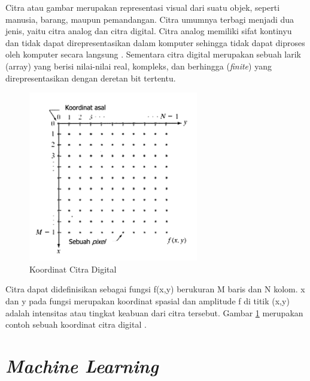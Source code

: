 Citra atau gambar merupakan representasi visual dari suatu objek, seperti manusia, barang, maupun pemandangan. Citra 
umumnya terbagi menjadi dua jenis, yaitu citra analog dan citra digital. Citra analog memiliki sifat kontinyu dan tidak 
dapat direpresentasikan dalam komputer sehingga tidak dapat diproses oleh komputer secara langsung \parencite{Tyagi2018}. 
Sementara citra digital merupakan sebuah larik (array) yang berisi nilai-nilai real, kompleks, dan berhingga (\emph{finite}) 
yang direpresentasikan dengan deretan bit tertentu. 

\begin{figure}[ht]
  \centering
  \includegraphics[scale=1]{gambar/Koordinat Citra Digital.png}
  \caption{Koordinat Citra Digital}
  \label{fig:koordinatcitradigital}
\end{figure}

Citra dapat didefinisikan sebagai fungsi f(x,y) berukuran M baris dan N kolom. x dan y pada fungsi merupakan koordinat 
spasial dan amplitude f di titik (x,y) adalah intensitas atau tingkat keabuan dari citra tersebut. Gambar 
\ref{fig:koordinatcitradigital} merupakan contoh sebuah koordinat citra digital \parencite{Putra2010}.

\section{\emph{Machine Learning}}
\label{sec:machinelearning}

